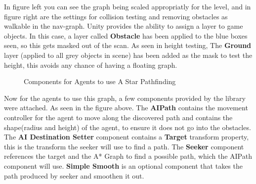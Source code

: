 \documentclass[12pt]{report}
\begin{document}
In figure left you can see the graph being scaled appropriatly for the level, and in figure right are the settings for collision testing and removing obstacles as walkable in the nav-graph. Unity provides the ability to assign a layer to game objects. In this case, a layer called \textbf{Obstacle} has been applied to the blue boxes seen, so this gets masked out of the scan. As seen in height testing, The \textbf{Ground} layer (applied to all grey objects in scene) has been added as the mask to test the height, this avoids any chance of having a floating graph.

\begin{figure}[H]
    \centering
    \caption{Components for Agents to use A Star Pathfinding}
\end{figure}

Now for the agents to use this graph, a few components provided by the library were attached. As seen in the figure above. The \textbf{AIPath} contains the movement controller for the agent to move along the discovered path and contains the shape(radius and height) of the agent, to ensure it does not go into the obstacles. The \textbf{AI Destination Setter} component contains a \textbf{Target} transform property, this is the transform the seeker will use to find a path. The \textbf{Seeker} component references the target and the A* Graph to find a possible path, which the AIPath component will use. \textbf{Simple Smooth} is an optional component that takes the path produced by seeker and smoothen it out.
\end{document}
